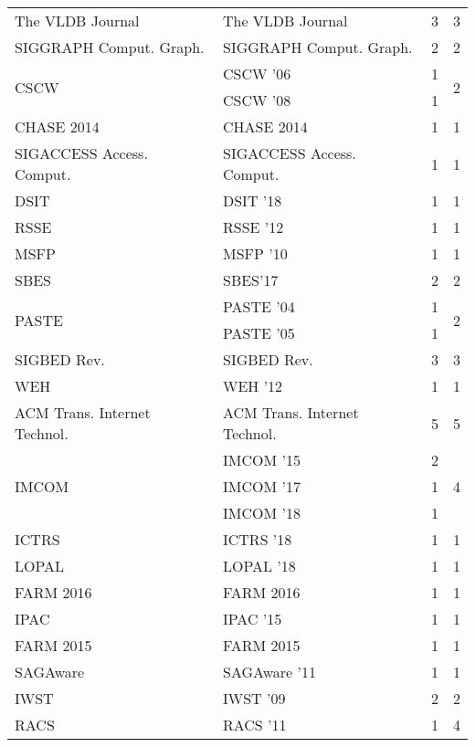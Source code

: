 \begin{table*}[t]
\begin{tabular}{llrr}
\multirow{1}{*}{The VLDB Journal} & The VLDB Journal & 3 & \multirow{1}{*}{3}\\
\multirow{1}{*}{SIGGRAPH Comput. Graph.} & SIGGRAPH Comput. Graph. & 2 & \multirow{1}{*}{2}\\
\multirow{2}{*}{CSCW } & CSCW '06 & 1 & \multirow{2}{*}{2}\\
& CSCW '08 & 1 &\\
\multirow{1}{*}{CHASE 2014} & CHASE 2014 & 1 & \multirow{1}{*}{1}\\
\multirow{1}{*}{SIGACCESS Access. Comput.} & SIGACCESS Access. Comput. & 1 & \multirow{1}{*}{1}\\
\multirow{1}{*}{DSIT } & DSIT '18 & 1 & \multirow{1}{*}{1}\\
\multirow{1}{*}{RSSE } & RSSE '12 & 1 & \multirow{1}{*}{1}\\
\multirow{1}{*}{MSFP } & MSFP '10 & 1 & \multirow{1}{*}{1}\\
\multirow{1}{*}{SBES} & SBES'17 & 2 & \multirow{1}{*}{2}\\
\multirow{2}{*}{PASTE } & PASTE '04 & 1 & \multirow{2}{*}{2}\\
& PASTE '05 & 1 &\\
\multirow{1}{*}{SIGBED Rev.} & SIGBED Rev. & 3 & \multirow{1}{*}{3}\\
\multirow{1}{*}{WEH } & WEH '12 & 1 & \multirow{1}{*}{1}\\
\multirow{1}{*}{ACM Trans. Internet Technol.} & ACM Trans. Internet Technol. & 5 & \multirow{1}{*}{5}\\
\multirow{3}{*}{IMCOM } & IMCOM '15 & 2 & \multirow{3}{*}{4}\\
& IMCOM '17 & 1 &\\
& IMCOM '18 & 1 &\\
\multirow{1}{*}{ICTRS } & ICTRS '18 & 1 & \multirow{1}{*}{1}\\
\multirow{1}{*}{LOPAL } & LOPAL '18 & 1 & \multirow{1}{*}{1}\\
\multirow{1}{*}{FARM 2016} & FARM 2016 & 1 & \multirow{1}{*}{1}\\
\multirow{1}{*}{IPAC } & IPAC '15 & 1 & \multirow{1}{*}{1}\\
\multirow{1}{*}{FARM 2015} & FARM 2015 & 1 & \multirow{1}{*}{1}\\
\multirow{1}{*}{SAGAware } & SAGAware '11 & 1 & \multirow{1}{*}{1}\\
\multirow{1}{*}{IWST } & IWST '09 & 2 & \multirow{1}{*}{2}\\
\multirow{4}{*}{RACS } & RACS '11 & 1 & \multirow{4}{*}{4}\\

\end{tabular}
\end{table*}

